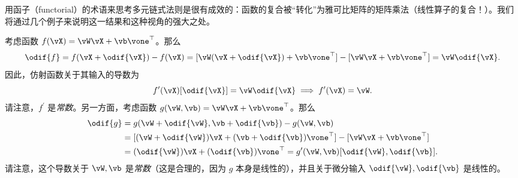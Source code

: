 \documentclass[../../book-main_zh.tex]{subfiles}
\begin{document}
用函子（functorial）的术语来思考多元链式法则是很有成效的：函数的复合被“转化”为雅可比矩阵的矩阵乘法（线性算子的复合！）。我们将通过几个例子来说明这一结果和这种视角的强大之处。

\begin{example}
    考虑函数 \(f(\vX) = \vW\vX + \vb\vone^{\top}\)。那么
    \begin{equation}
        \odif{f} = f(\vX + \odif{\vX}) - f(\vX) = [\vW(\vX +
        \odif{\vX}) + \vb\vone^{\top}] - [\vW \vX + \vb \vone^{\top}]
        = \vW\odif{\vX}.
    \end{equation}
    因此，仿射函数关于其输入的导数为
    \begin{equation}
        f^{\prime}(\vX)[\odif{\vX}] = \vW\odif{\vX} \implies
        f^{\prime}(\vX) = \vW.
    \end{equation}
    请注意，\(f^{\prime}\) 是\textit{常数}。另一方面，考虑函数 \(g(\vW, \vb) = \vW\vX + \vb\vone^{\top}\)。那么
    \begin{align}
        \odif{g}
        &= g(\vW + \odif{\vW}, \vb + \odif{\vb}) - g(\vW, \vb) 
        \\
        &=
        [(\vW + \odif{\vW})\vX + (\vb + \odif{\vb})\vone^{\top}] -
        [\vW\vX + \vb\vone^{\top}] \\
        &= (\odif{\vW})\vX + (\odif{\vb})\vone^{\top} =
        g^{\prime}(\vW, \vb)[\odif{\vW}, \odif{\vb}].
    \end{align}
    请注意，这个导数关于 \(\vW, \vb\) 是\textit{常数}（这是合理的，因为 \(g\) 本身是线性的），并且关于微分输入 \(\odif{\vW}, \odif{\vb}\) 是线性的。
\end{example}
\end{document}
